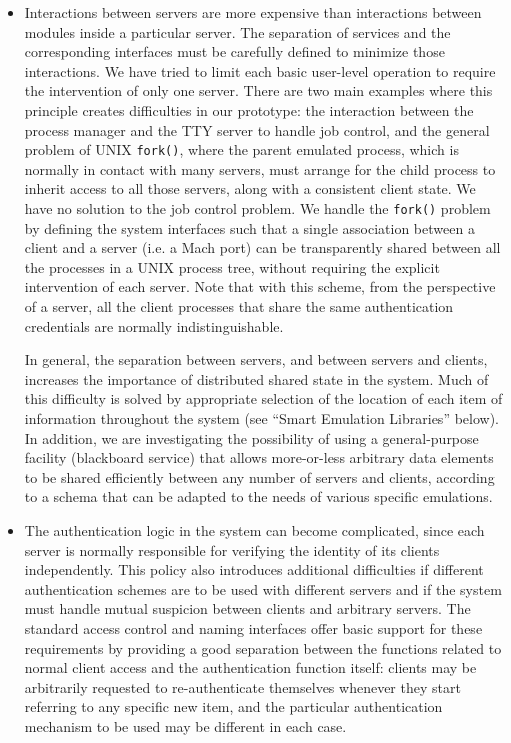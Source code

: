 \begin{itemize}

\item Interactions between servers are more expensive than
interactions between modules inside a particular server. The
separation of services and the corresponding interfaces must be
carefully defined to minimize those interactions. We have tried to
limit each basic user-level operation to require the intervention of
only one server. There are two main examples where this principle
creates difficulties in our prototype: the interaction between the
process manager and the TTY server to handle job control, and the
general problem of UNIX {\tt fork()}, where the parent emulated
process, which is normally in contact with many servers, must arrange
for the child process to inherit access to all those servers, along
with a consistent client state. We have no solution to the job control
problem. We handle the {\tt fork()} problem by defining the system
interfaces such that a single association between a client and a
server (i.e. a Mach port) can be transparently shared between all the
processes in a UNIX process tree, without requiring the explicit
intervention of each server. Note that with this scheme, from the
perspective of a server, all the client processes that share the same
authentication credentials are normally indistinguishable.

In general, the separation between servers, and between servers and
clients, increases the importance of distributed shared state in the
system. Much of this difficulty is solved by appropriate selection of
the location of each item of information throughout the system (see
``Smart Emulation Libraries'' below). In addition, we are
investigating the possibility of using a general-purpose facility
(blackboard service) that allows more-or-less arbitrary data elements
to be shared efficiently between any number of servers and clients,
according to a schema that can be adapted to the needs of various
specific emulations.

\item The authentication logic in the system can become complicated,
since each server is normally responsible for verifying the identity
of its clients independently.  This policy also introduces additional
difficulties if different authentication schemes are to be used with
different servers and if the system must handle mutual suspicion
between clients and arbitrary servers. The standard access control and
naming interfaces offer basic support for these requirements by
providing a good separation between the functions related to normal
client access and the authentication function itself: clients may be
arbitrarily requested to re-authenticate themselves whenever they
start referring to any specific new item, and the particular
authentication mechanism to be used may be different in each case.


\end{itemize}
